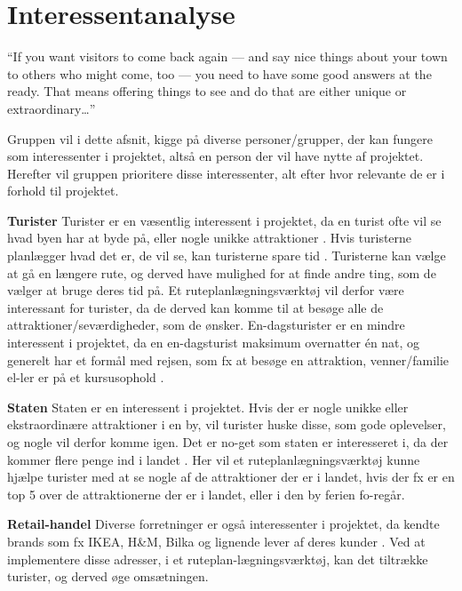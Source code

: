 \section*{Interessentanalyse}

“If you want visitors to come back again — and say nice things about your town to others who might come, too — you need to have some good answers at the ready. That means offering things to see and do that are either unique or extraordinary…”\citep{UniversityOfMinnesota}

Gruppen vil i dette afsnit, kigge på diverse personer/grupper, der kan fungere som interessenter i projektet, altså en person der vil have nytte af projektet. Herefter vil gruppen prioritere disse interessenter, alt efter hvor relevante de er i forhold til projektet.

\textbf{Turister}\newline
Turister er en væsentlig interessent i projektet, da en turist ofte vil se hvad byen har at byde på, eller nogle unikke attraktioner \citep{UniversityOfMinnesota}. 
Hvis turisterne planlægger hvad det er, de vil se, kan turisterne spare tid \citep{YouthCentral}. Turisterne kan vælge at gå en længere rute, og derved have mulighed for at finde andre ting, som de vælger at bruge deres tid på. Et ruteplanlægningsværktøj vil derfor være interessant for turister, da de derved kan komme til at besøge alle de attraktioner/seværdigheder, som de ønsker.
En-dagsturister er en mindre interessent i projektet, da en en-dagsturist maksimum overnatter én nat, og generelt har et formål med rejsen, som fx at besøge en attraktion, venner/familie el-ler er på et kursusophold \cite{YouthCentral}.

\textbf{Staten}\newline
Staten er en interessent i projektet. Hvis der er nogle unikke eller ekstraordinære attraktioner i en by, vil turister huske disse, som gode oplevelser, og nogle vil derfor komme igen. Det er no-get som staten er interesseret i, da der kommer flere penge ind i landet \citep{VisitAalborg}.
Her vil et ruteplanlægningsværktøj kunne hjælpe turister med at se nogle af de attraktioner der er i landet, hvis der fx er en top 5 over de attraktionerne der er i landet, eller i den by ferien fo-regår.

\textbf{Retail-handel}\newline
Diverse forretninger er også interessenter i projektet, da kendte brands som fx IKEA, H\&M, Bilka og lignende lever af deres kunder \citep{PengeloseButikker}. Ved at implementere disse adresser, i et ruteplan-lægningsværktøj, kan det tiltrække turister, og derved øge omsætningen. 

